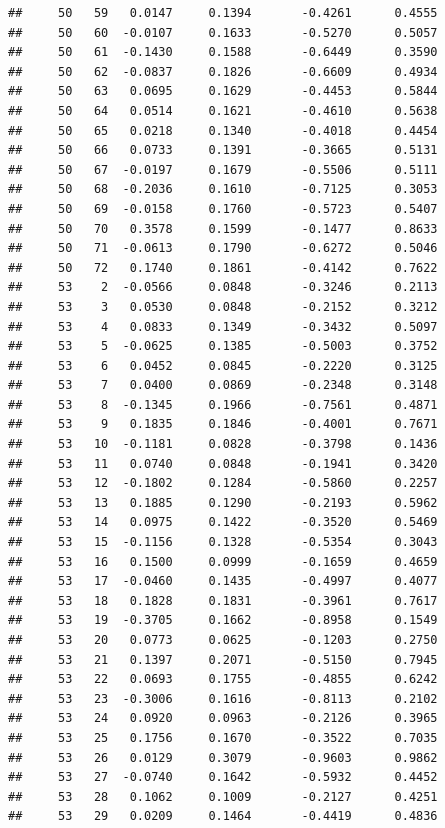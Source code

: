 \documentclass[
]{article}
\begin{document}
\begin{verbatim}
##     50   59   0.0147     0.1394       -0.4261      0.4555  
##     50   60  -0.0107     0.1633       -0.5270      0.5057  
##     50   61  -0.1430     0.1588       -0.6449      0.3590  
##     50   62  -0.0837     0.1826       -0.6609      0.4934  
##     50   63   0.0695     0.1629       -0.4453      0.5844  
##     50   64   0.0514     0.1621       -0.4610      0.5638  
##     50   65   0.0218     0.1340       -0.4018      0.4454  
##     50   66   0.0733     0.1391       -0.3665      0.5131  
##     50   67  -0.0197     0.1679       -0.5506      0.5111  
##     50   68  -0.2036     0.1610       -0.7125      0.3053  
##     50   69  -0.0158     0.1760       -0.5723      0.5407  
##     50   70   0.3578     0.1599       -0.1477      0.8633  
##     50   71  -0.0613     0.1790       -0.6272      0.5046  
##     50   72   0.1740     0.1861       -0.4142      0.7622  
##     53    2  -0.0566     0.0848       -0.3246      0.2113  
##     53    3   0.0530     0.0848       -0.2152      0.3212  
##     53    4   0.0833     0.1349       -0.3432      0.5097  
##     53    5  -0.0625     0.1385       -0.5003      0.3752  
##     53    6   0.0452     0.0845       -0.2220      0.3125  
##     53    7   0.0400     0.0869       -0.2348      0.3148  
##     53    8  -0.1345     0.1966       -0.7561      0.4871  
##     53    9   0.1835     0.1846       -0.4001      0.7671  
##     53   10  -0.1181     0.0828       -0.3798      0.1436  
##     53   11   0.0740     0.0848       -0.1941      0.3420  
##     53   12  -0.1802     0.1284       -0.5860      0.2257  
##     53   13   0.1885     0.1290       -0.2193      0.5962  
##     53   14   0.0975     0.1422       -0.3520      0.5469  
##     53   15  -0.1156     0.1328       -0.5354      0.3043  
##     53   16   0.1500     0.0999       -0.1659      0.4659  
##     53   17  -0.0460     0.1435       -0.4997      0.4077  
##     53   18   0.1828     0.1831       -0.3961      0.7617  
##     53   19  -0.3705     0.1662       -0.8958      0.1549  
##     53   20   0.0773     0.0625       -0.1203      0.2750  
##     53   21   0.1397     0.2071       -0.5150      0.7945  
##     53   22   0.0693     0.1755       -0.4855      0.6242  
##     53   23  -0.3006     0.1616       -0.8113      0.2102  
##     53   24   0.0920     0.0963       -0.2126      0.3965  
##     53   25   0.1756     0.1670       -0.3522      0.7035  
##     53   26   0.0129     0.3079       -0.9603      0.9862  
##     53   27  -0.0740     0.1642       -0.5932      0.4452  
##     53   28   0.1062     0.1009       -0.2127      0.4251  
##     53   29   0.0209     0.1464       -0.4419      0.4836  

\end{verbatim}
\end{document}
